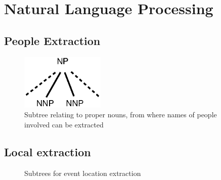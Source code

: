 \documentclass{llncs}
\begin{document}
\section{Natural Language Processing}

\subsection{People Extraction}

\begin{figure}[h]
	\centering
	\includegraphics[width=40mm]{dia/people.eps}
	\caption{Subtree relating to proper nouns, from where names of people involved can be extracted}
	\label{fig:people_extraction}
\end{figure}

\newpage
\subsection{Local extraction}

\begin{figure}[h]
	\centering
	\hspace{20mm}
	\caption{Subtrees for event location extraction}
	\label{fig:locals}
\end{figure}
\end{document}
